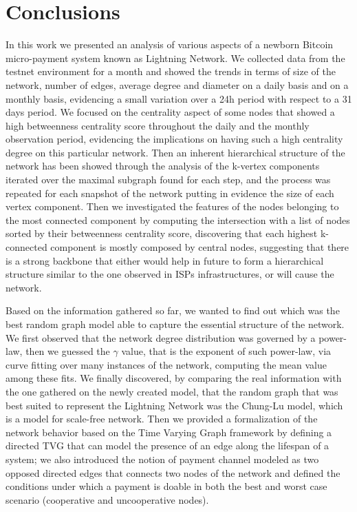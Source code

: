 
	\chapter{Conclusions}
	
	In this work we presented an analysis of various aspects of a newborn Bitcoin micro-payment system known as Lightning Network. We collected data from the testnet environment for a month and showed the trends in terms of size of the network, number of edges, average degree and diameter on a daily basis and on a monthly basis, evidencing a small variation over a 24h period with respect to a 31 days period. We focused on the centrality aspect of some nodes that showed a high betweenness centrality score throughout the daily and the monthly observation period, evidencing the implications on having such a high centrality degree on this particular network. Then an inherent hierarchical structure of the network has been showed through the analysis of the k-vertex components iterated over the maximal subgraph found for each step, and the process was repeated for each snapshot of the network putting in evidence the size of each vertex component. Then we investigated the features of the nodes belonging to the most connected component by computing the intersection with a list of nodes sorted by their betweenness centrality score, discovering that each highest k-connected component is mostly composed by central nodes, suggesting that there is a strong backbone that either would help in future to form a hierarchical structure similar to the one observed in ISPs infrastructures, or will cause the network.
	
	Based on the information gathered so far, we wanted to find out which was the best random graph model able to capture the essential structure of the network. We first observed that the network degree distribution was governed by a power-law, then we guessed the $\gamma$ value, that is the exponent of such power-law, via curve fitting over many instances of the network, computing the mean value among these fits. We finally discovered, by comparing the real information with the one gathered on the newly created model, that the random graph that was best suited to represent the Lightning Network was the Chung-Lu model, which is a model for scale-free network. Then we provided a formalization of the network behavior based on the Time Varying Graph framework by defining a directed TVG that can model the presence of an edge along the lifespan of a system; we also introduced the notion of payment channel modeled as two opposed directed edges that connects two nodes of the network and defined the conditions under which a payment is doable in both the best and worst case scenario (cooperative and uncooperative nodes).
	
